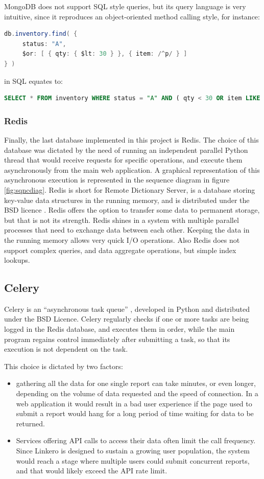 MongoDB does not support SQL style queries, but its query language is very
intuitive, since it reproduces an object-oriented method calling style, for
instance:
\begin{lstlisting}[language=Java, breaklines=true]
db.inventory.find( {
     status: "A",
     $or: [ { qty: { $lt: 30 } }, { item: /^p/ } ]
} )
\end{lstlisting}
in SQL equates to:
\begin{lstlisting}[language=SQL, breaklines=true]
SELECT * FROM inventory WHERE status = "A" AND ( qty < 30 OR item LIKE "p%")
\end{lstlisting}

\subsubsection{Redis}
Finally, the last database implemented in this project is Redis\texttrademark.
The choice of this database was dictated by the need of running an independent
parallel Python thread that would receive requests for specific operations,
and execute them asynchronously from the main web application. A graphical
representation of this asynchronous execution is represented in the sequence
diagram in figure \ref{fig:sqncdiag}. Redis is short for Remote Dictionary
Server, is a database storing key-value data structures in the running
memory, and is distributed under the BSD licence \cite{Redis}. Redis offers the
option to transfer some data to permanent storage, but that is not its strength.
Redis shines in a system with multiple parallel processes that need to
exchange data between each other. Keeping the data in the running memory allows
very quick I/O operations. Also Redis does not support complex queries, and data
aggregate operations, but simple index lookups.

\subsection{Celery}
Celery is an ``asynchronous task queue'' \cite{Celery}, developed in Python and
distributed under the BSD Licence. Celery regularly checks if one or more tasks
are being logged in the Redis database, and executes them in order, while the
main program regains control immediately after submitting a task, so that its
execution is not dependent on the task.

This choice is dictated by two factors:
\begin{itemize}
  \item gathering all the data for one single report can take minutes, or even
  longer, depending on the volume of data requested and the speed of connection.
  In a web application it would result in a bad user experience if the page used
  to submit a report would hang for a long period of time waiting for data to be
  returned.
  \item Services offering API calls to access their data often limit the call
  frequency. Since Linkero is designed to sustain a growing user population,
  the system would reach a stage where multiple users could submit concurrent
  reports, and that would likely exceed the API rate limit.
\end{itemize}

